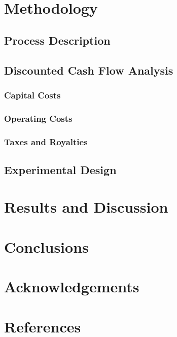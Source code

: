 \documentclass[preprint, authoryear]{elsarticle}
\begin{document}
\cite{Biglarbigi2008}

\section{Methodology}

\subsection{Process Description}

\subsection{Discounted Cash Flow Analysis}

\subsubsection{Capital Costs}

\subsubsection{Operating Costs}

\subsubsection{Taxes and Royalties}

\subsection{Experimental Design}

\section{Results and Discussion}

\section{Conclusions}

\section*{Acknowledgements}

\section*{References}


\end{document}
